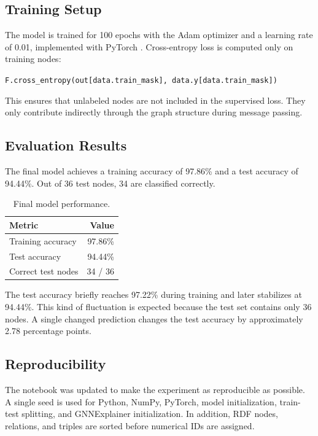 \documentclass[runningheads]{llncs}
\begin{document}
\subsection{Training Setup}

The model is trained for 100 epochs with the Adam optimizer and a learning rate of 0.01, implemented with PyTorch \cite{pytorch}. Cross-entropy loss is computed only on training nodes:

\begin{center}
\texttt{F.cross\_entropy(out[data.train\_mask], data.y[data.train\_mask])}
\end{center}

This ensures that unlabeled nodes are not included in the supervised loss. They only contribute indirectly through the graph structure during message passing.

\subsection{Evaluation Results}

The final model achieves a training accuracy of 97.86\% and a test accuracy of 94.44\%. Out of 36 test nodes, 34 are classified correctly.

\begin{table}
\centering
\caption{Final model performance.}
\begin{tabular}{|l|r|}
\hline
Metric & Value \\
\hline
Training accuracy & 97.86\% \\
\hline
Test accuracy & 94.44\% \\
\hline
Correct test nodes & 34 / 36 \\
\hline
\end{tabular}
\end{table}

The test accuracy briefly reaches 97.22\% during training and later stabilizes at 94.44\%. This kind of fluctuation is expected because the test set contains only 36 nodes. A single changed prediction changes the test accuracy by approximately 2.78 percentage points.

\subsection{Reproducibility}

The notebook was updated to make the experiment as reproducible as possible. A single seed is used for Python, NumPy, PyTorch, model initialization, train-test splitting, and GNNExplainer initialization. In addition, RDF nodes, relations, and triples are sorted before numerical IDs are assigned.
\end{document}
